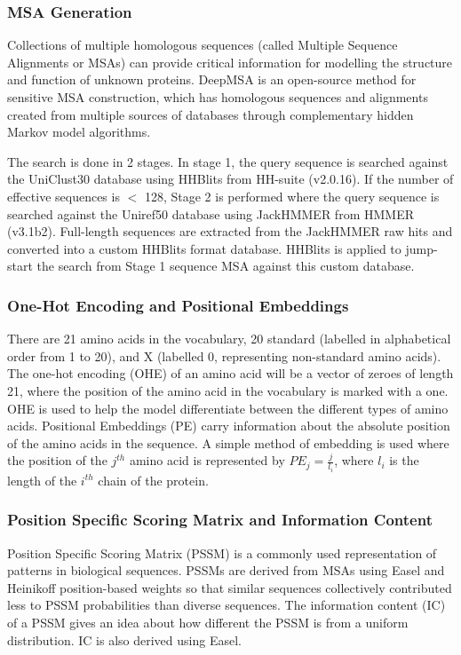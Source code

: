 \documentclass[journal=jacsat,manuscript=article]{achemso}
\begin{document}
\subsubsection{MSA Generation}
\quad Collections of multiple homologous sequences (called Multiple Sequence Alignments or MSAs) can provide critical information for modelling the structure and function of unknown proteins. DeepMSA \cite{zhang2020deepmsa} is an open-source method for sensitive MSA construction, which has homologous sequences and alignments created from multiple sources of databases through complementary hidden Markov model algorithms.

The search is done in 2 stages. In stage 1, the query sequence is searched against the UniClust30 \cite{mirdita2017uniclust} database using HHBlits from HH-suite\cite{remmert2012hhblits} (v2.0.16). If the number of effective sequences is $<$ 128, Stage 2 is performed where the query sequence is searched against the Uniref50 \cite{suzek2015uniref} database using JackHMMER from HMMER \cite{johnson2010hidden} (v3.1b2). Full-length sequences are extracted from the JackHMMER raw hits and converted into a custom HHBlits format database. HHBlits is applied to jump-start the search from Stage 1 sequence MSA against this custom database.

\subsubsection{One-Hot Encoding and Positional Embeddings}
\quad There are 21 amino acids in the vocabulary, 20 standard (labelled in alphabetical order from 1 to 20), and X (labelled 0, representing non-standard amino acids). The one-hot encoding (OHE) of an amino acid will be a vector of zeroes of length 21, where the position of the amino acid in the vocabulary is marked with a one. OHE is used to help the model differentiate between the different types of amino acids. Positional Embeddings (PE) carry information about the absolute position of the amino acids in the sequence. A simple method of embedding is used where the position of the $j^{th}$ amino acid is represented by ${PE}_{j} = \frac{j}{l_i}$, where $l_i$ is the length of the $i^{th}$ chain of the protein.

\newpage
\subsubsection{Position Specific Scoring Matrix and Information Content}
\quad Position Specific Scoring Matrix (PSSM) is a commonly used representation of patterns in biological sequences. PSSMs are derived from MSAs using Easel \cite{potter2018hmmer} and Heinikoff position-based weights so that similar sequences collectively contributed less to PSSM probabilities than diverse sequences. The information content (IC) of a PSSM gives an idea about how different the PSSM is from a uniform distribution. IC is also derived using Easel.
\end{document}
